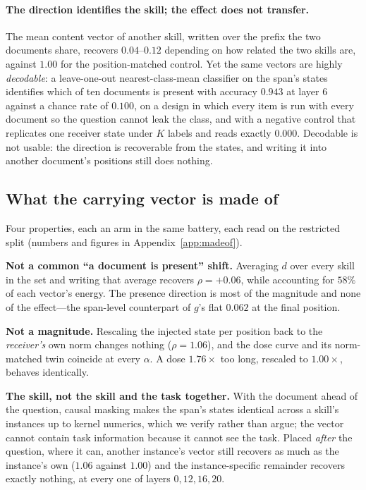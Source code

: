 \documentclass{article}
\newcommand{\dvec}{\ensuremath{d}}
\newcommand{\gvec}{\ensuremath{g}}
\begin{document}
\paragraph{The direction identifies the skill; the effect does not transfer.}
The mean content vector of another skill, written over the prefix the two
documents share, recovers $0.04$--$0.12$ depending on how related the two
skills are, against $1.00$ for the position-matched control. Yet the same
vectors are highly \emph{decodable}: a leave-one-out nearest-class-mean
classifier on the span's states identifies which of ten documents is present
with accuracy $0.943$ at layer 6 against a chance rate of $0.100$, on a design
in which every item is run with every document so the question cannot leak the
class, and with a negative control that replicates one receiver state under $K$
labels and reads exactly $0.000$. Decodable is not usable: the direction is
recoverable from the states, and writing it into another document's positions
still does nothing.

\subsection{What the carrying vector is made of}
\label{sec:whose:docklast}

Four properties, each an arm in the same battery, each read on the restricted
split (numbers and figures in Appendix~\ref{app:madeof}).

\textbf{Not a common ``a document is present'' shift.} Averaging $\dvec$ over
every skill in the set and writing that average recovers $\rho = +0.06$, while
accounting for $58\%$ of each vector's energy. The presence direction is most of
the magnitude and none of the effect---the span-level counterpart of $\gvec$'s
flat $0.062$ at the final position.

\textbf{Not a magnitude.} Rescaling the injected state per position back to the
\emph{receiver's} own norm changes nothing ($\rho = 1.06$), and the dose curve
and its norm-matched twin coincide at every $\alpha$. A dose $1.76\times$ too
long, rescaled to $1.00\times$, behaves identically.

\textbf{The skill, not the skill and the task together.} With the document ahead
of the question, causal masking makes the span's states identical across a
skill's instances up to kernel numerics, which we verify rather than argue; the vector cannot contain
task information because it cannot see the task. Placed \emph{after} the
question, where it can, another instance's vector still recovers as much as the
instance's own ($1.06$ against $1.00$) and the instance-specific remainder
recovers exactly nothing, at every one of layers $0, 12, 16, 20$.
\end{document}
